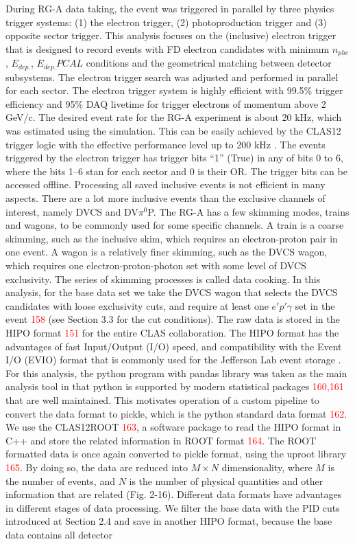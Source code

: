 \iffalse
During RG-A data taking, the event was triggered in parallel by three physics trigger systems: (1) the electron trigger, (2) photoproduction trigger and (3) opposite sector trigger. This analysis focuses on the (inclusive) electron trigger that is designed to record events with FD electron candidates with minimum $n_{phe}$, $E_{dep.}$, $E_{dep.} PCAL$ conditions and the geometrical matching between detector subsystems. The electron trigger search was adjusted and performed in parallel for each sector. The electron trigger system is highly efficient with 99.5\% trigger efficiency and 95\% DAQ livetime for trigger electrons of momentum above 2 GeV/c. The desired event rate for the RG-A experiment is about 20 kHz, which was estimated using the simulation. This can be easily achieved by the CLAS12 trigger logic with the effective performance level up to 200 kHz \parencite{Raydo2020TheSystem}. The events triggered by the electron trigger has trigger bits ``1'' (True) in any of bits 0 to 6, where the bits 1–6 stan for each sector and 0 is their OR. The trigger bits can be accessed offline. Processing all saved inclusive events is not efficient in many aspects. There are a lot more inclusive events than the exclusive channels of interest, namely DVCS and DV$\pi^0$P. The RG-A has a few skimming modes, trains and wagons, to be commonly used for some specific channels. A train is a coarse skimming, such as the inclusive skim, which requires an electron-proton pair in one event. A wagon is a relatively finer skimming, such as the DVCS wagon, which requires one electron-proton-photon set with some level of DVCS exclusivity. The series of skimming processes is called data cooking. In this analysis, for the base data set we take the DVCS wagon that selects the DVCS candidates with loose exclusivity cuts, and require at least one $e'p'\gamma$ set in the event \textcolor{red}{158} (see Section 3.3 for the cut conditions). The raw data is stored in the HIPO format \textcolor{red}{151} for the entire CLAS collaboration. The HIPO format has the advantages of fast Input/Output (I/O) speed, and compatibility with the Event I/O (EVIO) format that is commonly used for the Jefferson Lab event storage  \parencite{Wolin2007EVIOPackage}. For this analysis, the python program with pandas library was taken as the main analysis tool in that python is supported by modern statistical packages \textcolor{red}{160,161} that are well maintained. This motivates operation of a custom pipeline to convert the data format to pickle, which is the python standard data format \textcolor{red}{162}. We use the CLAS12ROOT \textcolor{red}{163}, a software package to read the HIPO format in C++ and store the related information in ROOT format \textcolor{red}{164}. The ROOT formatted data is once again converted to pickle format, using the uproot library \textcolor{red}{165}. By doing so, the data are reduced into $M \times N$ dimensionality, where $M$ is the number of events, and $N$ is the number of physical quantities and other information that are related (Fig. 2-16). Different data formats have advantages in different stages of data processing. We filter the base data with the PID cuts introduced at Section 2.4 and save in another HIPO format, because the base data contains all detector 